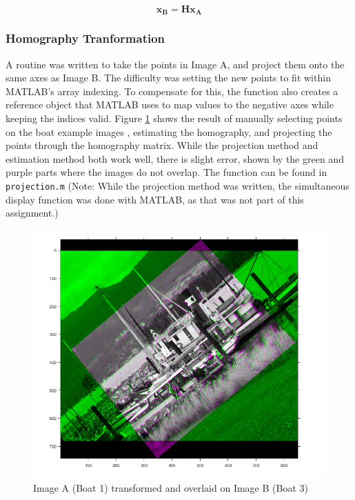 \documentclass[a4paper, 10pt, conference]{ieeeconf}
\begin{document}
\begin{equation} \label{eqn:homography}
    \textbf{x}_\textbf{B} = \textbf{Hx}_\textbf{A}
\end{equation}

\subsubsection{Homography Tranformation}
A routine was written to take the points in Image A, and project them onto the same axes as Image B. The difficulty was setting the new points to fit within MATLAB's array indexing. To compensate for this, the function also creates a reference object that MATLAB uses to map values to the negative axes while keeping the indices valid. Figure \ref{fig:boat13} shows the result of manually selecting points on the boat example images \cite{boat}, estimating the homography, and projecting the points through the homography matrix. While the projection method and estimation method both work well, there is slight error, shown by the green and purple parts where the images do not overlap. The function can be found in \texttt{projection.m} (Note: While the projection method was written, the simultaneous display function was done with MATLAB, as that was not part of this assignment.)

\begin{figure}[!ht]
  \centering
  \includegraphics[width=0.9\linewidth]{pic/q2_1_b4_1_3_pair}
  \caption{Image A (Boat 1) transformed and overlaid on Image B (Boat 3)}
  \label{fig:boat13}
\end{figure}
\end{document}
